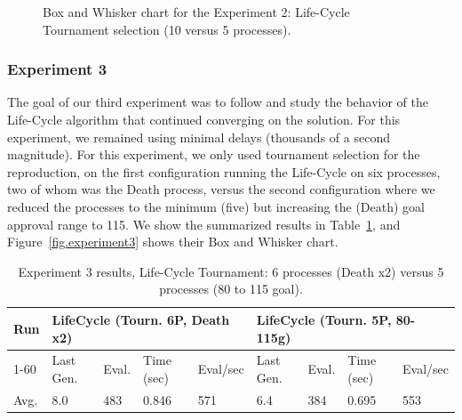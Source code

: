 \documentclass[graybox]{svmult}
\begin{document}
\begin{figure}
    \caption{Box and Whisker chart for the Experiment 2: Life-Cycle Tournament selection (10 versus 5 processes).} \label{fig.experiment2}
    \end{figure}


\subsubsection{Experiment 3} The goal of our third experiment was to follow and
study the behavior of the Life-Cycle algorithm that continued converging on the
solution. For this experiment, we remained using minimal delays (thousands of a
second magnitude). For this experiment, we only used tournament selection for
the reproduction, on the first configuration running the Life-Cycle on six
processes, two of whom was the Death process, versus the second configuration
where we reduced the processes to the minimum (five) but increasing the (Death)
goal approval range to 115. We show the summarized results in
Table~\ref{tab.experiment3}, and Figure~\ref{fig.experiment3} shows their Box
and Whisker chart.

\begin{table}[]
    \centering        
    \caption{Experiment 3 results, Life-Cycle Tournament: 6 processes (Death x2) versus 5 processes (80 to 115 goal).}\label{tab.experiment3}
    \begin{tabular}{|l|l|l|l|l|l|l|l|l|}
    \hline
    Run & \multicolumn{4}{l|}{LifeCycle (Tourn. 6P, Death x2)} & \multicolumn{4}{l|}{LifeCycle (Tourn. 5P, 80-115g)} \\ \hline
    1-60 & Last Gen. & Eval. & Time (sec) & Eval/sec & Last Gen. & Eval. & Time (sec) & Eval/sec \\ \hline
    Avg. & 8.0 & 483 & 0.846 & 571 & 6.4 & 384 & 0.695 & 553 \\ \hline
    \end{tabular}
    \end{table}
\end{document}
